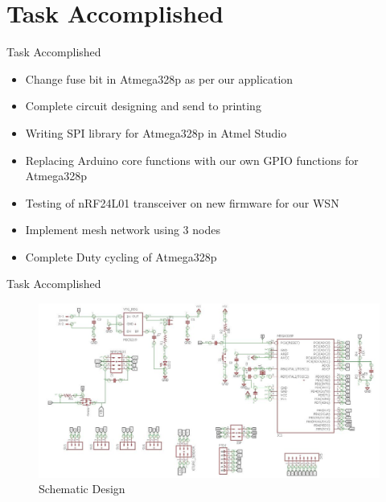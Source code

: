 \documentclass[10pt, a4paper]{beamer}
\begin{document}
\section{Task Accomplished}
\begin{frame}{Task Accomplished}
	\begin{itemize}
		\item  Change fuse bit in Atmega328p as per our application
        \item Complete circuit designing and send to printing
         \item Writing SPI library for Atmega328p in Atmel Studio
    	 \item Replacing Arduino core functions with our own GPIO functions for Atmega328p
         \item Testing of nRF24L01 transceiver on new firmware for our WSN 
     	 \item Implement mesh network using 3 nodes
         \item Complete Duty cycling of Atmega328p
 \end{itemize}

\end{frame}


\begin{frame}{Task Accomplished}
\begin{figure}
\begin{center}
\includegraphics[width=1\textwidth]{eagle_sch_snap.JPG}
\caption{Schematic Design}
\end{center}
\end{figure}
\end {frame}
\end{document}
